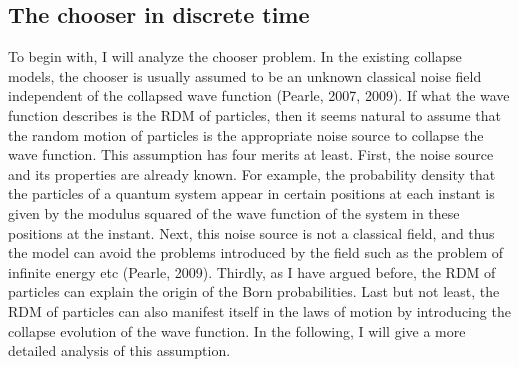 \subsection{The chooser in discrete time}

To begin with, I will analyze the chooser problem. In the existing collapse models, the chooser is usually assumed to be an unknown classical noise field independent of the collapsed wave function (Pearle, 2007, 2009). If what the wave function describes is the RDM of particles, then it seems natural to assume that the random motion of particles is the appropriate noise source to collapse the wave function. This assumption has four merits at least. First, the noise source and its properties are already known. For example, the probability density that the particles of a quantum system appear in certain positions at each instant is given by the modulus squared of the wave function of the system in these positions at the instant. Next, this noise source is not a classical field, and thus the model can avoid the problems introduced by the field such as the problem of infinite energy etc (Pearle, 2009). 
Thirdly, as I have argued before, the RDM of particles can explain the origin of the Born probabilities.
Last but not least, the RDM of particles can also manifest itself in the laws of motion by introducing the collapse evolution of the wave function. In the following, I will give a more detailed analysis of this assumption.




